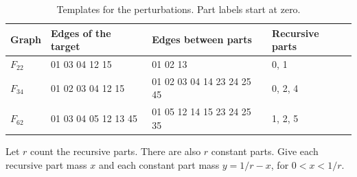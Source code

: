 \begin{table}[htb]
\centering\small
\begin{tabular}{@{}llll@{}}
\toprule
Graph & Edges of the target & Edges between parts & Recursive parts\\
\midrule
\(F_{22}\) & 01 03 04 12 15 & 01 02 13 & 0, 1\\
\(F_{34}\) & 01 02 03 04 12 15 & 01 02 03 04 14 23 24 25 45 & 0, 2, 4\\
\(F_{62}\) & 01 03 04 05 12 13 45 & 01 05 12 14 15 23 24 25 35 & 1, 2, 5\\
\bottomrule
\end{tabular}
\caption{Templates for the perturbations. Part labels start at zero.}
\label{tab:parts}
\end{table}

Let \(r\) count the recursive parts. There are also \(r\) constant parts.
Give each recursive part mass \(x\) and each constant part mass
\(y=1/r-x\), for \(0<x<1/r\).


